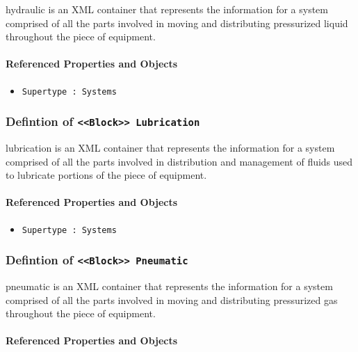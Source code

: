 hydraulic is an XML container that represents the information for a system comprised of all the parts involved in moving and distributing pressurized liquid throughout the piece of equipment.

\FloatBarrier
\paragraph{Referenced Properties and Objects}

\begin{itemize}
\item \texttt{Supertype : Systems}

\end{itemize}
\FloatBarrier
\subsubsection{Defintion of \texttt{<<Block>> Lubrication}}
  \label{type:Lubrication}

\FloatBarrier

lubrication is an XML container that represents the information for a system comprised of all the parts involved in distribution and management of fluids used to lubricate portions of the piece of equipment.

\FloatBarrier
\paragraph{Referenced Properties and Objects}

\begin{itemize}
\item \texttt{Supertype : Systems}

\end{itemize}
\FloatBarrier
\subsubsection{Defintion of \texttt{<<Block>> Pneumatic}}
  \label{type:Pneumatic}

\FloatBarrier

pneumatic is an XML container that represents the information for a system comprised of all the parts involved in moving and distributing pressurized gas throughout the piece of equipment.

\FloatBarrier
\paragraph{Referenced Properties and Objects}

